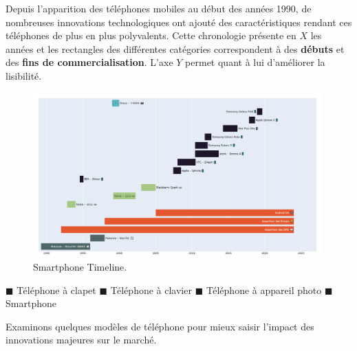 \documentclass[
  12pt,
]{report}
\begin{document}
Depuis l'apparition des téléphones mobiles au début des années 1990, de
nombreuses innovations technologiques ont ajouté des caractéristiques
rendant ces téléphones de plus en plus polyvalents. Cette chronologie
présente en \(X\) les années et les rectangles des différentes
catégories correspondent à des \textbf{débuts} et des \textbf{fins de
commercialisation}. L'axe \(Y\) permet quant à lui d'améliorer la
lisibilité.

\begin{figure}[htbp]
    \centering
    \includegraphics[width=0.99\textwidth]{imgs/smartphones_timeline.png}
    \caption{Smartphone Timeline.}
    \label{fig:smartphones}
\end{figure}

\textcolor{colgraph1}{$\blacksquare$} Téléphone à clapet
\textcolor{colgraph2}{$\blacksquare$} Téléphone à clavier
\textcolor{colgraph3}{$\blacksquare$} Téléphone à appareil photo
\(\blacksquare\) Smartphone

Examinons quelques modèles de téléphone pour mieux saisir l'impact des
innovations majeures sur le marché.
\end{document}
